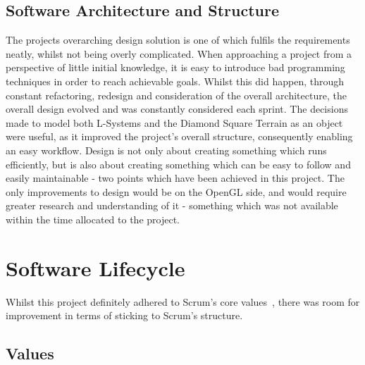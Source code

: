 \documentclass[a4paper,10pt]{report}
\begin{document}
\subsection{Software Architecture and Structure}

The projects overarching design solution is one of which fulfils the requirements neatly, whilst not being overly complicated. When approaching a project from a perspective of little initial knowledge, it is easy to introduce bad programming techniques in order to reach achievable goals. Whilst this did happen, through constant refactoring, redesign and consideration of the overall architecture, the overall design evolved and was constantly considered each sprint. The decisions made to model both L-Systems and the Diamond Square Terrain as an object were useful, as it improved the project's overall structure, consequently enabling an easy workflow. Design is not only about creating something which runs efficiently, but is also about creating something which can be easy to follow and easily maintainable - two points which have been achieved in this project. The only improvements to design would be on the OpenGL side, and would require greater research and understanding of it - something which was not available within the time allocated to the project.
    
    
\section{Software Lifecycle}

Whilst this project definitely adhered to Scrum's core values~\cite{alliance2008scrum}, there was room for improvement in terms of sticking to Scrum's structure.

\subsection{Values}
\end{document}
